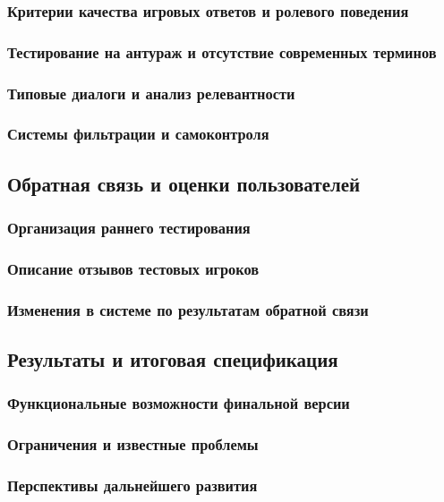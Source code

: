 \subsubsection{Критерии качества игровых ответов и ролевого поведения}
\subsubsection{Тестирование на антураж и отсутствие современных терминов}
\subsubsection{Типовые диалоги и анализ релевантности}
\subsubsection{Системы фильтрации и самоконтроля}

\subsection{Обратная связь и оценки пользователей}
\subsubsection{Организация раннего тестирования}
\subsubsection{Описание отзывов тестовых игроков}
\subsubsection{Изменения в системе по результатам обратной связи}

\subsection{Результаты и итоговая спецификация}
\subsubsection{Функциональные возможности финальной версии}
\subsubsection{Ограничения и известные проблемы}
\subsubsection{Перспективы дальнейшего развития}